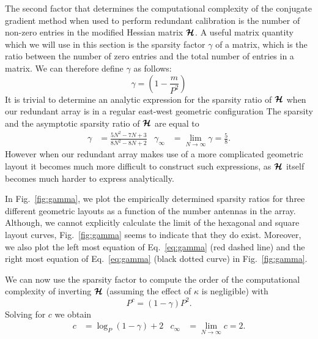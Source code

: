 \documentclass[useAMS,usenatbib]{mn2e}
\newcommand{\bH}{\bmath{H}}
\newcommand{\bmH}{\bmath{\mathcal{H}}}
\begin{document}
The second factor that determines the computational complexity of the conjugate gradient method when used to perform redundant calibration is the number of non-zero
entries in the modified Hessian matrix $\bmH$. 
A useful matrix quantity which we will use in this section is the sparsity factor $\gamma$ of a matrix, which is the ratio between the number of zero entries and the total number of entries in a matrix. We 
can therefore define $\gamma$ as follows:
\begin{equation}
 \gamma = \left (1 - \frac{m}{P^2} \right ) 
\end{equation}
It is trivial to determine an analytic expression for the sparsity ratio of $\bmH$ when our redundant array is in a regular east-west geometric configuration
The sparsity and the asymptotic sparsity ratio of $\bmH$ are equal to
\begin{align}
\gamma &= \frac{5N^2-7N+3}{8N^2-8N+2} & \gamma_{\infty} &= \lim_{N\rightarrow \infty}\gamma = \frac{5}{8} \label{eq:gamma}. 
\end{align}
However when our redundant array makes use of a more complicated geometric layout it becomes much more difficult to construct such expressions, as $\bmH$ itself 
becomes much harder to express analytically. 

In Fig.~\ref{fig:gamma}, we plot the empirically determined sparsity ratios for three different geometric layouts as a function of the number antennas in the array. Although, we cannot explicitly calculate 
the limit of the hexagonal and square layout curves, Fig.~\ref{fig:gamma} seems to indicate that they do exist. Moreover, we also plot the left most equation
of Eq.~\eqref{eq:gamma} (red dashed line) and the right most equation of Eq.~\eqref{eq:gamma} (black dotted curve) in Fig.~\ref{fig:gamma}.  

We can now use the sparsity factor to compute the order of the computational complexity of inverting $\bmH$ (assuming the effect of $\kappa$ is negligible) with
\begin{equation}
P^{c} = (1 - \gamma)P^2.
\end{equation}
Solving for $c$ we obtain
\begin{align}
c &= \log_{P}(1 - \gamma) + 2 & c_{\infty} &= \lim_{N\rightarrow \infty} c = 2. \label{eq:c}
\end{align}
\end{document}
